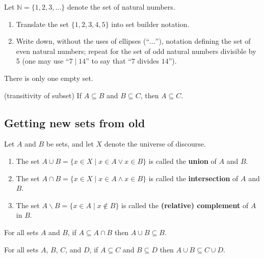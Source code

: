 \begin{exercises} Let $\mathbb{N} = \{1, 2, 3, \ldots\}$ denote the set of natural numbers.\begin{enumerate}
    \item Translate the set $\{1, 2, 3, 4, 5\}$ into set builder notation.
    \item Write down, without the uses of ellipses (``$\ldots$''), notation defining the set of even natural numbers; repeat for the set of odd natural numbers divisible by 5 (one may use ``$7\mid 14$'' to say that ``$7$ divides $14$'').
\end{enumerate}\end{exercises}

\begin{theorem}\label{thm:nullsetunique} There is only one empty set.
\end{theorem}

\begin{theorem}\label{thm:subsettransitivity} (transitivity of subset) If $A \subseteq B$ and $B \subseteq C$, then $A \subseteq C$.
\end{theorem}

\subsection{Getting new sets from old}
\begin{definition} Let $A$ and $B$ be sets, and let $X$ denote the universe of discourse.
\begin{enumerate}
    \item \label{def:setunion} The set $A \cup B = \{x\in X\mid x \in A \lor x\in B\}$ is called the \textbf{union} of $A$ and $B$.
    \item \label{def:setintersection} The set $A \cap B = \{x\in X\mid x \in A \land x\in B\}$ is called the \textbf{intersection} of $A$ and $B$.
    \item \label{def:setcomplement} The set $A \smallsetminus B = \{x\in A\mid x \not\in B\}$ is called the \textbf{(relative) complement} of $A$ in $B$.
\end{enumerate}
\end{definition}

\begin{theorem} For all sets $A$ and $B$, if $A \subseteq A \cap B$ then $A \cup B \subseteq B$.
\end{theorem}

\begin{theorem} For all sets $A$, $B$, $C$, and $D$, if $A\subseteq C$ and $B\subseteq D$ then $A\cup B \subseteq C\cup D$.
\end{theorem}

